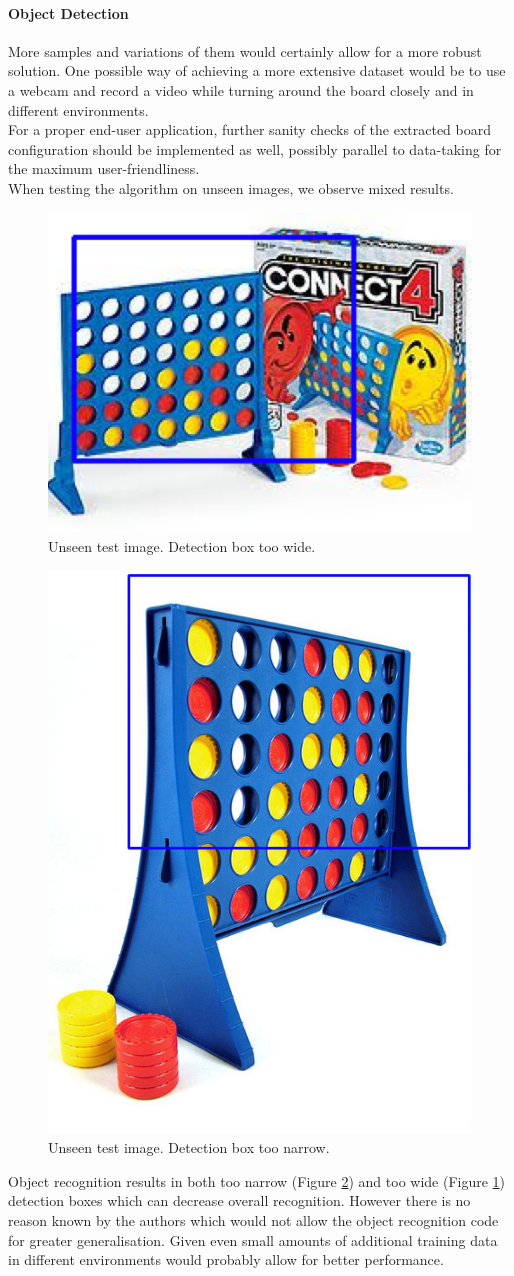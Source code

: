 \documentclass[10pt,twocolumn,letterpaper]{article}
\begin{document}
\paragraph{Object Detection}
More samples and variations of them would certainly allow for a more robust solution. 
One possible way of achieving a more extensive dataset would be to use a webcam and record a video while turning around the board closely and in different environments.\\
For a proper end-user application, further sanity checks of the extracted board configuration should be implemented as well, possibly parallel to data-taking for the maximum user-friendliness.\\
When testing the algorithm on unseen images, we observe mixed results.
\begin{figure}[!h]
  \centering
  \includegraphics[width = .3\textwidth]{figures/unseen1.png}
  \caption{Unseen test image. Detection box too wide.}
  \label{fig:unseen1}
\end{figure}
\begin{figure}[!h]
  \centering
  \includegraphics[width = .3\textwidth]{figures/unseen2.png}
  \caption{Unseen test image. Detection box too narrow.}
  \label{fig:unseen2}
\end{figure}
Object recognition results in both too narrow (Figure \ref{fig:unseen2}) and too wide (Figure \ref{fig:unseen1}) detection boxes which can decrease overall recognition.
However there is no reason known by the authors which would not allow the object recognition code for greater generalisation. Given even small amounts of additional training data in different environments would probably allow for better performance.


{\small
\printbibliography
}
\end{document}
